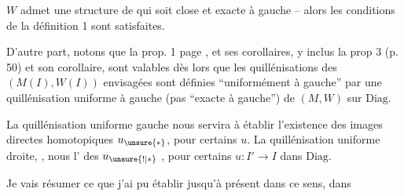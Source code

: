 
$W$ admet une structure de   qui soit close et exacte à gauche -- alors les conditions de la définition 1 sont satisfaites. 

D'autre part, notons que la prop. 1 page , et ses corollaires, y inclus la prop 3 (p. 50) et son corollaire, sont  valables dès lors que les quillénisations des $(M(I),W(I))$ envisagées sont définies ``uniformément à gauche'' par une quillénisation uniforme à gauche (pas  ``exacte à gauche'') de $(M,W)$ sur $\mathrm{Diag}$.

La quillénisation uniforme gauche nous servira à établir l'existence des images directes homotopiques $u_{\unsure{*}}$, pour certains $u$. La quillénisation uniforme droite, ,  nous   l' des $u_{\unsure{!|*}}$ , pour certains $u:I'\to I$ dans $\mathrm{Diag}$.

Je vais résumer ce que j'ai pu établir jusqu'à présent dans ce sens, dans 
